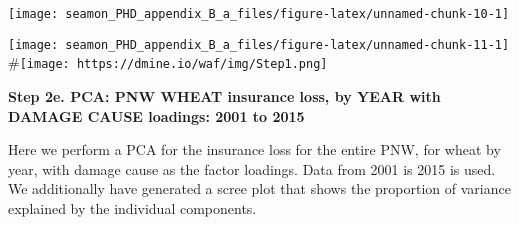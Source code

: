 \documentclass[]{article}
\newenvironment{Shaded}{\begin{snugshade}}{\end{snugshade}}
\newcommand{\CommentTok}[1]{\textcolor[rgb]{0.56,0.35,0.01}{\textit{#1}}}
\newcommand{\DataTypeTok}[1]{\textcolor[rgb]{0.13,0.29,0.53}{#1}}
\newcommand{\DecValTok}[1]{\textcolor[rgb]{0.00,0.00,0.81}{#1}}
\newcommand{\KeywordTok}[1]{\textcolor[rgb]{0.13,0.29,0.53}{\textbf{#1}}}
\newcommand{\NormalTok}[1]{#1}
\newcommand{\OperatorTok}[1]{\textcolor[rgb]{0.81,0.36,0.00}{\textbf{#1}}}
\newcommand{\StringTok}[1]{\textcolor[rgb]{0.31,0.60,0.02}{#1}}
\begin{document}
\texttt{[image: seamon\_PHD\_appendix\_B\_a\_files/figure-latex/unnamed-chunk-10-1]}

\begin{Shaded}
\end{Shaded}

\texttt{[image: seamon\_PHD\_appendix\_B\_a\_files/figure-latex/unnamed-chunk-11-1]}
\#\texttt{[image: https://dmine.io/waf/img/Step1.png]}

\textbf{Step 2e. PCA: PNW WHEAT insurance loss, by YEAR with DAMAGE
CAUSE loadings: 2001 to 2015}

Here we perform a PCA for the insurance loss for the entire PNW, for
wheat by year, with damage cause as the factor loadings. Data from 2001
is 2015 is used. We additionally have generated a scree plot that shows
the proportion of variance explained by the individual components.
\end{document}

